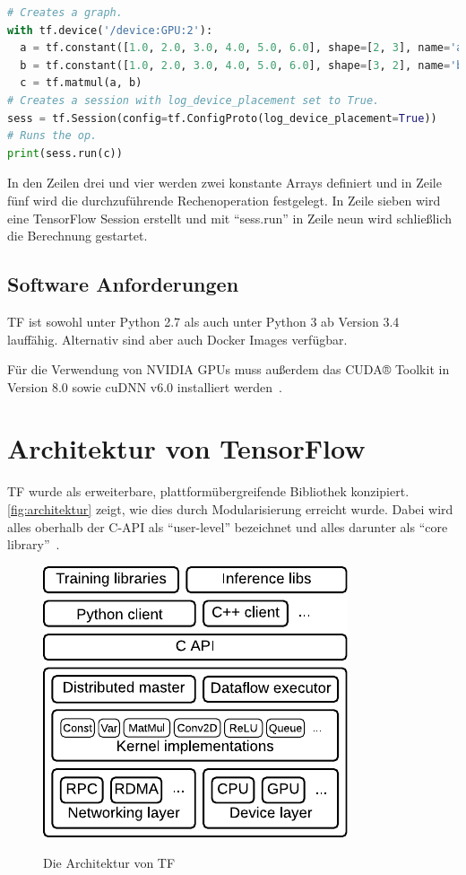 \begin{minipage}{\linewidth}
\begin{lstlisting}[language=Python, label=lst:tf-dev, caption={Festlegung des Geräts, auf dem die Berechnung getätigt werden soll}]
# Creates a graph.
with tf.device('/device:GPU:2'):
  a = tf.constant([1.0, 2.0, 3.0, 4.0, 5.0, 6.0], shape=[2, 3], name='a')
  b = tf.constant([1.0, 2.0, 3.0, 4.0, 5.0, 6.0], shape=[3, 2], name='b')
  c = tf.matmul(a, b)
# Creates a session with log_device_placement set to True.
sess = tf.Session(config=tf.ConfigProto(log_device_placement=True))
# Runs the op.
print(sess.run(c))
\end{lstlisting}
\end{minipage}
\vspace{0.2cm}

In den Zeilen drei und vier werden zwei konstante Arrays definiert und in Zeile fünf wird die durchzuführende Rechenoperation festgelegt. In Zeile sieben wird eine TensorFlow Session erstellt und mit "`sess.run"' in Zeile neun wird schließlich die Berechnung gestartet.

\subsection{Software Anforderungen}
\Gls{TF} ist sowohl unter Python 2.7 als auch unter Python 3 ab Version 3.4~\cite{tfinstall} lauffähig. Alternativ sind aber auch Docker Images verfügbar.

Für die Verwendung von NVIDIA GPUs muss außerdem das CUDA® Toolkit in Version 8.0 	sowie cuDNN v6.0 installiert werden~\cite{tfinstall}.

\section{Architektur von TensorFlow}
\Gls{TF} wurde als erweiterbare, plattformübergreifende Bibliothek konzipiert. \autoref{fig:architektur} zeigt, wie dies durch Modularisierung erreicht wurde. Dabei wird alles oberhalb der C-API als "`user-level"' bezeichnet und alles darunter als "`core library"'~\cite{tensorflow2016-whitepaper}.

\begin{figure}[htb!]
	\centering
	 \includegraphics[width=.5\textwidth]{images/architektur.pdf}\\
	\vspace{10pt} 
	\caption{Die Architektur von \gls{TF}~\cite{tensorflow2016-whitepaper}}
	\label{fig:architektur}
\end{figure}

